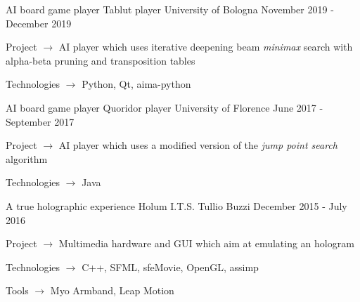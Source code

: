 
\begin{cventries}

  \cventry
    {AI board game player}
    {Tablut player}
    {University of Bologna}
    {November 2019 - December 2019}
    {
      \begin{cvitems}
        \item {Project $\rightarrow$ AI player which uses iterative deepening beam \textit{minimax} search with alpha-beta pruning and transposition tables}
        \item {Technologies $\rightarrow$ Python, Qt, aima-python}
      \end{cvitems}
    }
 
  \cventry
    {AI board game player}
    {Quoridor player}
    {University of Florence}
    {June 2017 - September 2017}
    {
      \begin{cvitems}
        \item {Project $\rightarrow$ AI player which uses a modified version of the \textit{jump point search} algorithm}
        \item {Technologies $\rightarrow$ Java}
      \end{cvitems}
    }

  \cventry
    {A true holographic experience}
    {Holum}
    {I.T.S. Tullio Buzzi}
    {December 2015 - July 2016}
    {
      \begin{cvitems}
        \item {Project $\rightarrow$ Multimedia hardware and GUI which aim at emulating an hologram}
        \item {Technologies $\rightarrow$ C++, SFML, sfeMovie, OpenGL, assimp}
        \item {Tools $\rightarrow$ Myo Armband, Leap Motion}
      \end{cvitems}
    }

\end{cventries}
